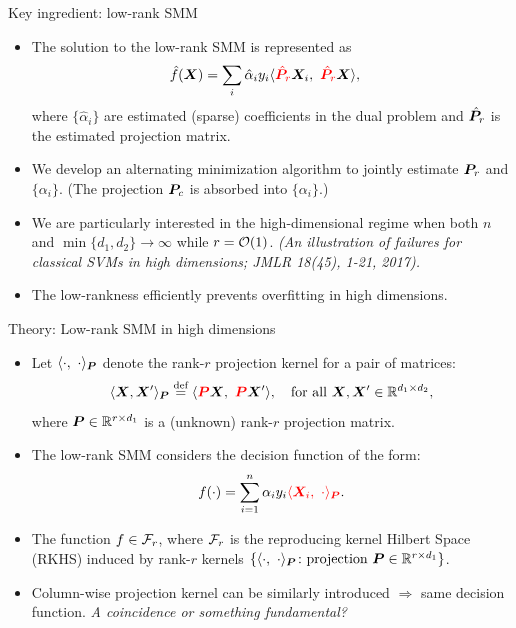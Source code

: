 \documentclass[compress,dvipsnames]{beamer}
\let\olditem\item
\renewcommand\item{\olditem\justifying}
\begin{document}
\begin{frame}{Key ingredient: low-rank SMM}
\begin{itemize}
\item The solution to the low-rank SMM is represented as
\begin{align}
\hat f(\bm{X})&=\sum_{i}\hat \alpha_i y_i\langle {\color{red}\hat {\bm{P}}_r}\bm{X}_i,\ {\color{red}\hat {\bm{P}}_r }\bm{X} \rangle,
\end{align}
where $\{\hat \alpha_i\}$ are estimated (sparse) coefficients in the dual problem and $\hat {\bm{P}}_r$ is the estimated projection matrix. 
\item We develop an alternating minimization algorithm to jointly estimate $\bm{P}_r$ and $\{\alpha_i\}$. (The projection $\bm{P}_c$ is absorbed into $\{\alpha_i\}$.)
\item We are particularly interested in the high-dimensional regime when both $n$ and $\min\{d_1,d_2\}\to \infty$ while $r={\mathcal O}(1)$. {\it \scriptsize(An illustration of failures for classical SVMs in high dimensions; JMLR 18(45), 1-21, 2017).} 
\item The {\color{red}low-rankness} efficiently prevents overfitting in high dimensions.
 \end{itemize}
\end{frame}

\begin{frame}{Theory: Low-rank SMM in high dimensions}

\begin{itemize}
\item Let $\langle \cdot,\ \cdot \rangle_{\bm{P}}$ denote the rank-$r$ projection kernel for a pair of matrices:
\[
\langle \bm{X}, \bm{X}' \rangle_{\bm{P}}\stackrel{\text{def}}{=} \langle {\color{red}\bm{P}} \bm{X},\ {\color{red}\bm{P}} \bm{X}'\rangle, \quad \text{for all }\bm{X}, \bm{X}'\in\mathbb{R}^{d_1\times d_2},
\]
where $\bm{P}\in \mathbb{R}^{r\times d_1}$ is a (unknown) rank-$r$ projection matrix.
\item The low-rank SMM considers the decision function of the form:
\begin{align}\label{eq:f}
f(\cdot)=\sum_{i=1}^n \alpha_i y_i {\color{red}\langle \bm{X}_i,\ \cdot \rangle_{\bm{P}}}.
\end{align}
\item The function $f\in {\mathcal F}_r$, where ${\mathcal F}_r$ is the reproducing kernel Hilbert Space (RKHS) induced by rank-$r$ kernels $\{\langle \cdot,\ \cdot\rangle_{\bm{P}}\colon {\text{projection }} \bm{P}\in\mathbb{R}^{r\times d_1}\}$. 
\item Column-wise projection kernel can be similarly introduced $\Rightarrow$ same decision function. {\it A coincidence or something fundamental?} 
\end{itemize}
\end{frame}
\end{document}

